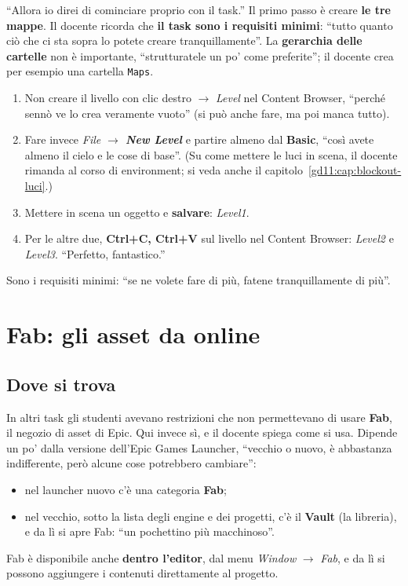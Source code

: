 ``Allora io direi di cominciare proprio con il task.'' Il primo passo è creare
\textbf{le tre mappe}. Il docente ricorda che \textbf{il task sono i requisiti
minimi}: ``tutto quanto ciò che ci sta sopra lo potete creare tranquillamente''.
La \textbf{gerarchia delle cartelle} non è importante, ``strutturatele un po'
come preferite''; il docente crea per esempio una cartella \texttt{Maps}.
\begin{enumerate}
  \item Non creare il livello con clic destro $\rightarrow$ \emph{Level} nel
        Content Browser, ``perché sennò ve lo crea veramente vuoto'' (si può
        anche fare, ma poi manca tutto).
  \item Fare invece \emph{File $\rightarrow$ \textbf{New Level}} e partire
        almeno dal \textbf{Basic}, ``così avete almeno il cielo e le cose di
        base''. (Su come mettere le luci in scena, il docente rimanda al corso
        di environment; si veda anche il capitolo~\ref{gd11:cap:blockout-luci}.)
  \item Mettere in scena un oggetto e \textbf{salvare}: \emph{Level1}.
  \item Per le altre due, \textbf{Ctrl+C, Ctrl+V} sul livello nel Content
        Browser: \emph{Level2} e \emph{Level3}. ``Perfetto, fantastico.''
\end{enumerate}
Sono i requisiti minimi: ``se ne volete fare di più, fatene tranquillamente di
più''.

\section{Fab: gli asset da online}
\label{gd12:sec:fab}

\subsection{Dove si trova}

In altri task gli studenti avevano restrizioni che non permettevano di usare
\textbf{Fab}, il negozio di asset di Epic. Qui invece sì, e il docente spiega
come si usa. Dipende un po' dalla versione dell'Epic Games Launcher, ``vecchio o
nuovo, è abbastanza indifferente, però alcune cose potrebbero cambiare'':
\begin{itemize}
  \item nel launcher nuovo c'è una categoria \textbf{Fab};
  \item nel vecchio, sotto la lista degli engine e dei progetti, c'è il
        \textbf{Vault} (la libreria), e da lì si apre Fab: ``un pochettino più
        macchinoso''.
\end{itemize}
Fab è disponibile anche \textbf{dentro l'editor}, dal menu \emph{Window}
$\rightarrow$ \emph{Fab}, e da lì si possono aggiungere i contenuti direttamente
al progetto.

